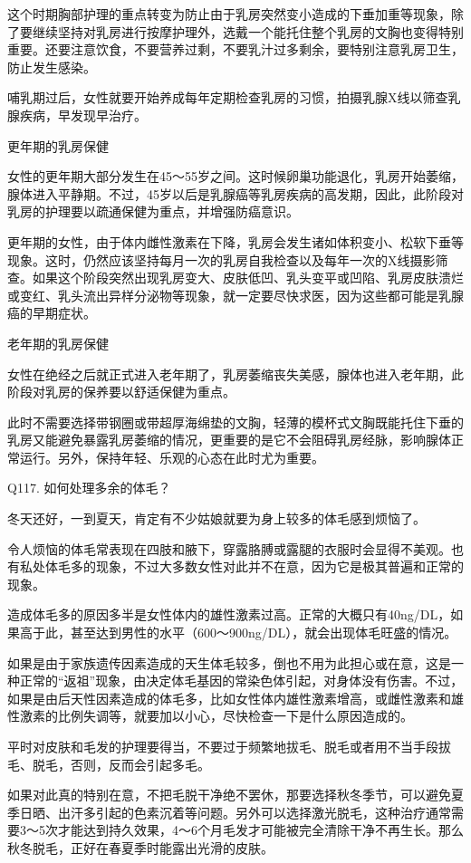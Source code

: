 \documentclass[12pt,UTF8]{ctexbook}
\begin{document}
这个时期胸部护理的重点转变为防止由于乳房突然变小造成的下垂加重等现象，除了要继续坚持对乳房进行按摩护理外，选戴一个能托住整个乳房的文胸也变得特别重要。还要注意饮食，不要营养过剩，不要乳汁过多剩余，要特别注意乳房卫生，防止发生感染。

哺乳期过后，女性就要开始养成每年定期检查乳房的习惯，拍摄乳腺X线以筛查乳腺疾病，早发现早治疗。

更年期的乳房保健

女性的更年期大部分发生在45～55岁之间。这时候卵巢功能退化，乳房开始萎缩，腺体进入平静期。不过，45岁以后是乳腺癌等乳房疾病的高发期，因此，此阶段对乳房的护理要以疏通保健为重点，并增强防癌意识。

更年期的女性，由于体内雌性激素在下降，乳房会发生诸如体积变小、松软下垂等现象。这时，仍然应该坚持每月一次的乳房自我检查以及每年一次的X线摄影筛查。如果这个阶段突然出现乳房变大、皮肤低凹、乳头变平或凹陷、乳房皮肤溃烂或变红、乳头流出异样分泌物等现象，就一定要尽快求医，因为这些都可能是乳腺癌的早期症状。

老年期的乳房保健

女性在绝经之后就正式进入老年期了，乳房萎缩丧失美感，腺体也进入老年期，此阶段对乳房的保养要以舒适保健为重点。

此时不需要选择带钢圈或带超厚海绵垫的文胸，轻薄的模杯式文胸既能托住下垂的乳房又能避免暴露乳房萎缩的情况，更重要的是它不会阻碍乳房经脉，影响腺体正常运行。另外，保持年轻、乐观的心态在此时尤为重要。





Q117. 如何处理多余的体毛？


冬天还好，一到夏天，肯定有不少姑娘就要为身上较多的体毛感到烦恼了。

令人烦恼的体毛常表现在四肢和腋下，穿露胳膊或露腿的衣服时会显得不美观。也有私处体毛多的现象，不过大多数女性对此并不在意，因为它是极其普遍和正常的现象。

造成体毛多的原因多半是女性体内的雄性激素过高。正常的大概只有40ng/DL，如果高于此，甚至达到男性的水平（600～900ng/DL），就会出现体毛旺盛的情况。

如果是由于家族遗传因素造成的天生体毛较多，倒也不用为此担心或在意，这是一种正常的“返祖”现象，由决定体毛基因的常染色体引起，对身体没有伤害。不过，如果是由后天性因素造成的体毛多，比如女性体内雄性激素增高，或雌性激素和雄性激素的比例失调等，就要加以小心，尽快检查一下是什么原因造成的。

平时对皮肤和毛发的护理要得当，不要过于频繁地拔毛、脱毛或者用不当手段拔毛、脱毛，否则，反而会引起多毛。

如果对此真的特别在意，不把毛脱干净绝不罢休，那要选择秋冬季节，可以避免夏季日晒、出汗多引起的色素沉着等问题。另外可以选择激光脱毛，这种治疗通常需要3～5次才能达到持久效果，4～6个月毛发才可能被完全清除干净不再生长。那么秋冬脱毛，正好在春夏季时能露出光滑的皮肤。
\end{document}
